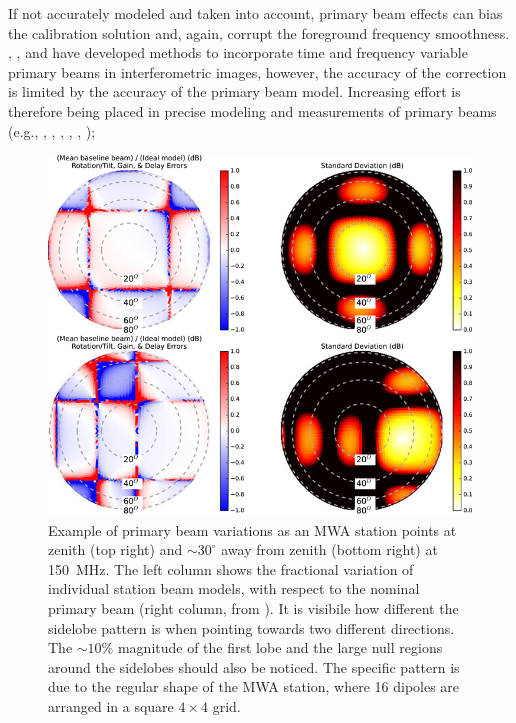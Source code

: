 \begin{itemize}
If not accurately modeled and taken into account, primary beam effects can bias the calibration solution and, again, corrupt the foreground frequency smoothness.  \cite{bhatnagar08}, \cite{bernardi11}, \cite{sullivan12} and \cite{tasse13} have developed methods to incorporate time and frequency variable primary beams in interferometric images, however, the accuracy of the correction is limited by the accuracy of the primary beam model. Increasing effort is therefore being placed in precise modeling and measurements of primary beams (e.g., \cite{pupillo15}, \cite{trott16}, \cite{deleraacedo17}, \cite{trott17a}, \cite{jacobs17}, \cite{deleraacedo18});
\begin{figure}[]
\begin{center}
\includegraphics[width=1.\textwidth]{Bernardi/mwa_beams_err}
\end{center}
\caption{Example of primary beam variations as an MWA station points at zenith (top right) and $\sim 30^\circ$ away from zenith (bottom right) at 150~MHz. The left column shows the fractional variation of individual station beam models, with respect to the nominal primary beam (right column, from \cite{neben16}). It is visibile how different the sidelobe pattern is when pointing towards two different directions. The $\sim 10\%$ magnitude of the first lobe and the large null regions around the sidelobes should also be noticed. The specific pattern is due to the regular shape of the MWA station, where 16 dipoles are arranged in a square $4 \times 4$ grid.}
\label{fig:fig3}
\end{figure}



\end{itemize}
